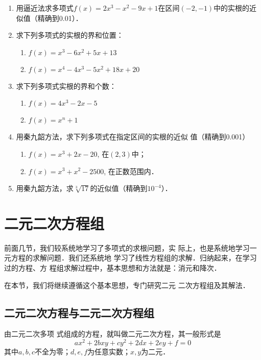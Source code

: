 \begin{enumerate}
    \item 用逼近法求多项式$f(x)=2x^3-x^2-9x+1$在区间$(-2,
    -1)$中的实根的近似值（精确到0.01）．
    \item 求下列多项式的实根的界和位置：
    \begin{enumerate}
        \item  $f(x)=x^3-6x^2+5x+13$
        \item  $f(x)=x^4-4x^3-5x^2+18x+20$
    \end{enumerate}

    \item 求下列多项式实根的界和个数：
    \begin{enumerate}
        \item   $f(x)=4x^3-2x-5$
        \item  $f(x)=x^n+1$
    \end{enumerate}
  
    \item  用秦九韶方法，求下列多项式在指定区间的实根的近似
    值（精确到0.001）
    \begin{enumerate}
      \item $f(x)=x^3+2x-20$, 在$(2,3)$中；
    \item $f(x)=x^3+x^2-2500$, 在正数范围内．
    \end{enumerate}
    \item  用秦九韶方法，求$\sqrt[3]{17}$的近似值（精确到$10^{-4}$）．
\end{enumerate}

\section{二元二次方程组}
前面几节，我们较系统地学习了多项式的求根问题，实
际上，也是系统地学习一元方程的求解问题．我们还系统地
学习了线性方程组的求解．归纳起来，在学习过的方程、方
程组求解过程中，基本思想和方法就是：消元和降次．

在本节，我们将继续遵循这个基本思想，专门研究二元
二次方程组及其解法．

\subsection{二元二次方程与二元二次方程组}

由二元二次多项
式组成的方程，就叫做二元二次方程，其一般形式是
\begin{equation}
    ax^2+2bxy+cy^2+2dx+2ey+f=0
\end{equation}
其中$a,b,c$不全为零；$d,e,f$为任意实数；$x,y$为二元．


